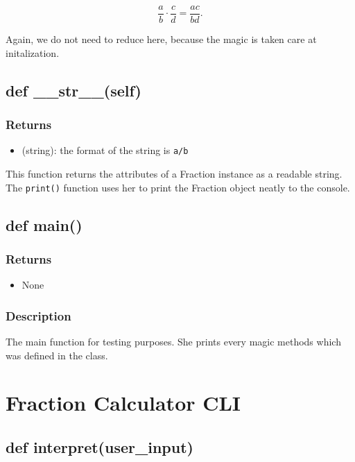 \documentclass[refman]{scrartcl}
\begin{document}
\begin{equation}
	\frac{a}{b} \cdot \frac{c}{d} = \frac{ac}{bd} \text{.}
\end{equation}

Again, we do not need to reduce here, because the magic is taken care at initalization.

\subsection{def \_\_str\_\_(self)}

\subsubsection*{Returns}

\begin{itemize}
	\item (string): the format of the string is \texttt{a/b}
\end{itemize}

This function returns the attributes of a Fraction instance as a readable string. The \texttt{print()} function uses her to print the Fraction object neatly to the console.

\subsection{def main()}

\subsubsection*{Returns}

\begin{itemize}
	\item None
\end{itemize}

\subsubsection*{Description}

The main function for testing purposes. She prints every magic methods which was defined in the class.

\section{Fraction Calculator CLI}

\subsection{def interpret(user\_input)}
\end{document}
